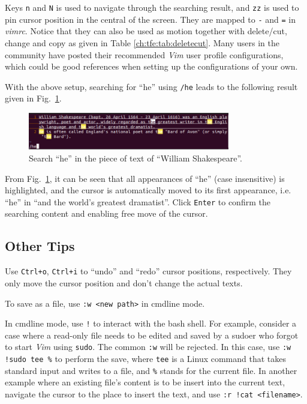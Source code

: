 Keys \verb|n| and \verb|N| is used to navigate through the searching result, and \verb|zz| is used to pin cursor position in the central of the screen. They are mapped to \verb|-| and \verb|=| in \textit{vimrc}. Notice that they can also be used as motion together with delete/cut, change and copy as given in Table \ref{ch:tfe:tab:deletecut}. Many users in the community have posted their recommended \textit{Vim} user profile configurations, which could be good references when setting up the configurations of your own.

With the above setup, searching for ``he'' using \verb|/he| leads to the following result given in Fig.~\ref{ch:tfe:fig:vimdemo2}.
\begin{figure}[htbp]
\centering
\includegraphics[width=250pt]{chapters/ch-text-file-editing/figures/vimdemo2.png}
\caption{Search ``he'' in the piece of text of ``William Shakespeare''.} \label{ch:tfe:fig:vimdemo2}
\end{figure}
From Fig.~\ref{ch:tfe:fig:vimdemo2}, it can be seen that all appearances of ``he'' (case insensitive) is highlighted, and the cursor is automatically moved to its first appearance, i.e. ``he'' in ``and the world's greatest dramatist''. Click \verb|Enter| to confirm the searching content and enabling free move of the cursor.

\subsection{Other Tips}

Use \verb|Ctrl+o|, \verb|Ctrl+i| to ``undo'' and ``redo'' cursor positions, respectively. They only move the cursor position and don't change the actual texts.

To save as a file, use \verb|:w <new path>| in cmdline mode.

In cmdline mode, use \verb|!| to interact with the bash shell. For example, consider a case where a read-only file needs to be edited and saved by a sudoer who forgot to start \textit{Vim} using \verb|sudo|. The common \verb|:w| will be rejected. In this case, use \verb|:w !sudo tee %| to perform the save, where \verb|tee| is a Linux command that takes standard input and writes to a file, and \verb|%| stands for the current file. In another example where an existing file's content is to be insert into the current text, navigate the cursor to the place to insert the text, and use \verb|:r !cat <filename>|.

